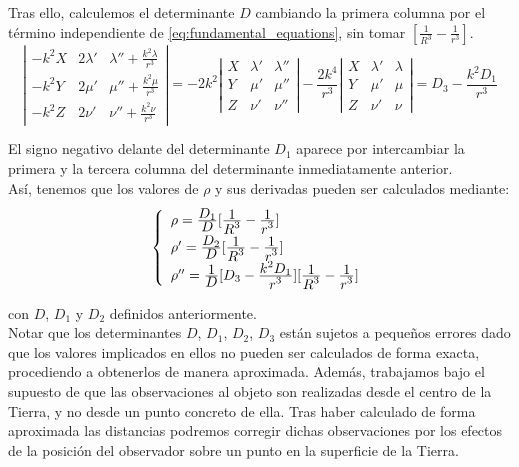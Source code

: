 \documentclass[11pt]{book}
\newcommand\ddfrac[2]{\frac{\displaystyle #1}{\displaystyle #2}}
\begin{document}
Tras ello, calculemos el determinante $D$ cambiando la primera columna por el término independiente de \eqref{eq:fundamental_equations}, sin tomar $[\frac{1}{R^3}-\frac{1}{r^3}]$. 
\[
\left|
\begin{array}{ccc}
-k^2X & 2\lambda' & \lambda''+\frac{k^2\lambda}{r^3}\\
-k^2Y & 2\mu' & \mu''+\frac{k^2\mu}{r^3}\\
-k^2Z & 2\nu' & \nu''+\frac{k^2\nu}{r^3}
\end{array}
\right|
=-2k^2
\left|
\begin{array}{ccc}
X & \lambda' & \lambda''\\
Y & \mu' & \mu''\\
Z & \nu' & \nu''
\end{array}
\right|
-\frac{2k^4}{r^3}
\left|
\begin{array}{ccc}
X & \lambda' & \lambda\\
Y & \mu' & \mu\\
Z & \nu' & \nu
\end{array}
\right|
=
D_3-\frac{k^2D_1}{r^3}
\]

El signo negativo delante del determinante $D_1$ aparece por intercambiar la primera y la tercera columna del determinante inmediatamente anterior.\\

Así, tenemos que los valores de $\rho$ y sus derivadas pueden ser calculados mediante:
\begin{align}
\left\{
\def\arraystretch{1.5}
\begin{array}{l}
	\rho   = \ddfrac{D_1}{D}[\ddfrac{1}{R^3}-\ddfrac{1}{r^3}]\\
	\rho'  = \ddfrac{D_2}{D}[\ddfrac{1}{R^3}-\ddfrac{1}{r^3}]\\
	\rho'' = \ddfrac{1}{D}[D_3-\ddfrac{k^2D_1}{r^3}][\ddfrac{1}{R^3}-\ddfrac{1}{r^3}]
\end{array}
\right.
\label{eq:rho_values}
\end{align}

\noindent con $D$, $D_1$ y $D_2$ definidos anteriormente.\\

Notar que los determinantes $D$, $D_1$, $D_2$, $D_3$ están sujetos a pequeños errores dado que los valores implicados en ellos no pueden ser calculados de forma exacta, procediendo a obtenerlos de manera aproximada. Además, trabajamos bajo el supuesto de que las observaciones al objeto son realizadas desde el centro de la Tierra, y no desde un punto concreto de ella. Tras haber calculado de forma aproximada las distancias podremos corregir dichas observaciones por los efectos de la posición del observador sobre un punto en la superficie de la Tierra.\\
\end{document}
